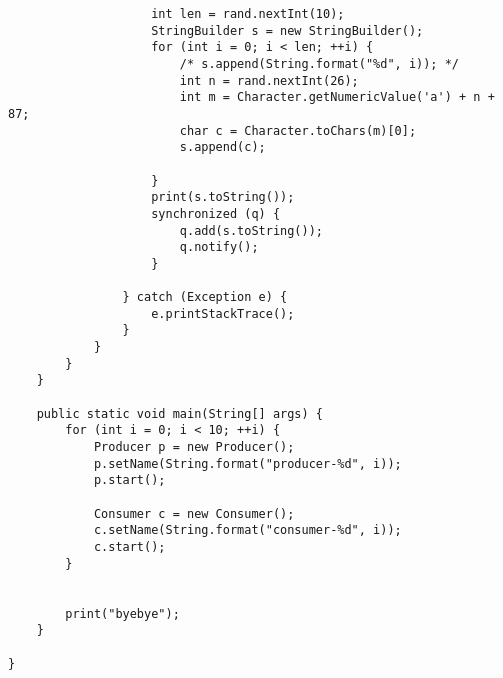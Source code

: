 \begin{lstlisting}
                    int len = rand.nextInt(10);
                    StringBuilder s = new StringBuilder();
                    for (int i = 0; i < len; ++i) {
                        /* s.append(String.format("%d", i)); */
                        int n = rand.nextInt(26);
                        int m = Character.getNumericValue('a') + n + 87;
                        char c = Character.toChars(m)[0];
                        s.append(c);

                    }
                    print(s.toString());
                    synchronized (q) {
                        q.add(s.toString());
                        q.notify();
                    }

                } catch (Exception e) {
                    e.printStackTrace();
                }
            }
        }
    }

    public static void main(String[] args) {
        for (int i = 0; i < 10; ++i) {
            Producer p = new Producer();
            p.setName(String.format("producer-%d", i));
            p.start();

            Consumer c = new Consumer();
            c.setName(String.format("consumer-%d", i));
            c.start();
        }


        print("byebye");
    }

}
\end{lstlisting}



